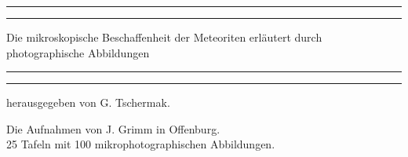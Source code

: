 \documentclass[a4paper, 12pt, oneside]{article}
\begin{document}
\begin{titlepage} %
	\centering %
	\scshape %

	
	\rule{\textwidth}{1.6pt}\vspace*{-\baselineskip}\vspace*{2pt} %
	\rule{\textwidth}{0.4pt} %
	
	\vspace{0.75\baselineskip} %

        {\LARGE Die mikroskopische Beschaffenheit der Meteoriten erläutert durch photographische Abbildungen} %
	
	\vspace{0.75\baselineskip} %
	
	\rule{\textwidth}{0.4pt}\vspace*{-\baselineskip}\vspace{3.2pt} %
	\rule{\textwidth}{1.6pt} %
	
	\vspace{1\baselineskip} %
	
	
	{herausgegeben von G. Tschermak.} %
	
	\vspace*{1\baselineskip} %
	

 	{\small Die Aufnahmen von J. Grimm in Offenburg.\\ 25 Tafeln mit 100 mikrophotographischen Abbildungen.} %

	\vspace{1\baselineskip} %

	
	

\end{titlepage}
\end{document}
